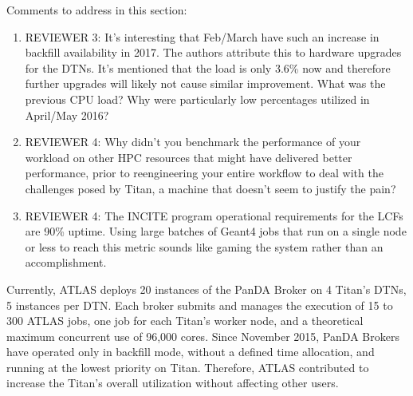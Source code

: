 \ifreview
Comments to address in this section:
\begin{enumerate}
    \item REVIEWER 3: It’s interesting that Feb/March have such an increase
    in backfill availability in 2017. The authors attribute this to hardware
    upgrades for the DTNs. It’s mentioned that the load is only 3.6\% now and
    therefore further upgrades will likely not cause similar improvement.
    What was the previous CPU load? Why were particularly low percentages
    utilized in April/May 2016?
    \item REVIEWER 4: Why didn’t you benchmark the performance of your
    workload on other HPC resources that might have delivered better
    performance, prior to reengineering your entire workflow to deal with the
    challenges posed by Titan, a machine that doesn’t seem to justify the
    pain?
    \item REVIEWER 4: The INCITE program operational requirements for the
    LCFs are 90\% uptime. Using large batches of Geant4 jobs that run on a
    single node or less to reach this metric sounds like gaming the system
    rather than an accomplishment.
\end{enumerate}
\fi

Currently, ATLAS deploys 20 instances of the PanDA Broker on 4 Titan's DTNs,
5 instances per DTN\@. Each broker submits and manages the execution of 15 to
300 ATLAS jobs, one job for each Titan's worker node, and a theoretical
maximum concurrent use of 96,000 cores. Since November 2015, PanDA Brokers
have operated only in backfill mode, without a defined time allocation, and
running at the lowest priority on Titan. Therefore, ATLAS contributed to
increase the Titan's overall utilization without affecting other users.

